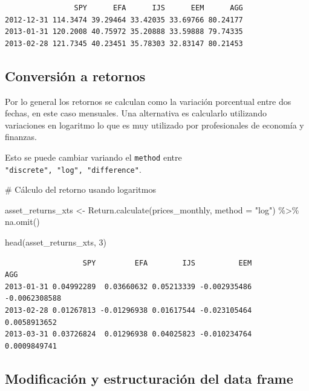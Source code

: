 \documentclass[
  letterpaper,
  DIV=11,
  numbers=noendperiod]{scrartcl}
\newenvironment{Shaded}{\begin{snugshade}}{\end{snugshade}}
\newcommand{\AttributeTok}[1]{\textcolor[rgb]{0.40,0.45,0.13}{#1}}
\newcommand{\CommentTok}[1]{\textcolor[rgb]{0.37,0.37,0.37}{#1}}
\newcommand{\DecValTok}[1]{\textcolor[rgb]{0.68,0.00,0.00}{#1}}
\newcommand{\FunctionTok}[1]{\textcolor[rgb]{0.28,0.35,0.67}{#1}}
\newcommand{\NormalTok}[1]{\textcolor[rgb]{0.00,0.23,0.31}{#1}}
\newcommand{\OtherTok}[1]{\textcolor[rgb]{0.00,0.23,0.31}{#1}}
\newcommand{\SpecialCharTok}[1]{\textcolor[rgb]{0.37,0.37,0.37}{#1}}
\newcommand{\StringTok}[1]{\textcolor[rgb]{0.13,0.47,0.30}{#1}}
\begin{document}
\begin{verbatim}
                SPY      EFA      IJS      EEM      AGG
2012-12-31 114.3474 39.29464 33.42035 33.69766 80.24177
2013-01-31 120.2008 40.75972 35.20888 33.59888 79.74335
2013-02-28 121.7345 40.23451 35.78303 32.83147 80.21453
\end{verbatim}

\subsection{Conversión a retornos}\label{conversiuxf3n-a-retornos}

Por lo general los retornos se calculan como la variación porcentual
entre dos fechas, en este caso mensuales. Una alternativa es calcularlo
utilizando variaciones en logaritmo lo que es muy utilizado por
profesionales de economía y finanzas.

Esto se puede cambiar variando el \texttt{method} entre
\texttt{"discrete",\ "log",\ "difference"}.

\begin{Shaded}
\begin{Highlighting}[]
\CommentTok{\# Cálculo del retorno usando logaritmos}

\NormalTok{asset\_returns\_xts }\OtherTok{\textless{}{-}}
  \FunctionTok{Return.calculate}\NormalTok{(prices\_monthly,}
                   \AttributeTok{method =} \StringTok{"log"}\NormalTok{) }\SpecialCharTok{\%\textgreater{}\%}
  \FunctionTok{na.omit}\NormalTok{()}

\FunctionTok{head}\NormalTok{(asset\_returns\_xts, }\DecValTok{3}\NormalTok{)}
\end{Highlighting}
\end{Shaded}

\begin{verbatim}
                  SPY         EFA        IJS          EEM           AGG
2013-01-31 0.04992289  0.03660632 0.05213339 -0.002935486 -0.0062308588
2013-02-28 0.01267813 -0.01296938 0.01617544 -0.023105464  0.0058913652
2013-03-31 0.03726824  0.01296938 0.04025823 -0.010234764  0.0009849741
\end{verbatim}

\subsection{Modificación y estructuración del data
frame}\label{modificaciuxf3n-y-estructuraciuxf3n-del-data-frame}
\end{document}
